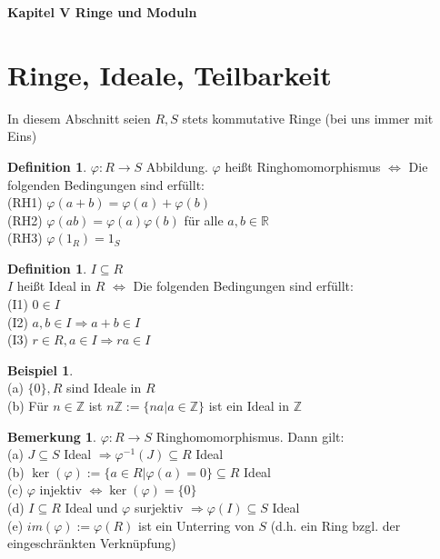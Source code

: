 \documentclass[10pt,a4paper,numbers=endperiod]{scrartcl}
\theoremstyle{definition}
\newtheorem{defi}[satz]{Definition}
\newtheorem{bem}[satz]{Bemerkung}
\newtheorem{bsp}[satz]{Beispiel}
\def\RR{{\mathbb R}}
\def\ZZ{{\mathbb Z}}
\begin{document}
\textbf{\Large Kapitel V Ringe und Moduln}\\

\section{Ringe, Ideale, Teilbarkeit}

In diesem Abschnitt seien $R,S$ stets kommutative Ringe (bei uns immer mit Eins)

\begin{defi}
	$\varphi: R \rightarrow S$ Abbildung. $\varphi$ heißt Ringhomomorphismus $\Leftrightarrow$ Die folgenden Bedingungen sind erfüllt:\\
	(RH1) $\varphi(a+b) = \varphi(a) + \varphi(b)$\\
	(RH2) $\varphi(ab) = \varphi(a)\varphi(b)$ für alle $a,b \in \RR$\\
	(RH3) $\varphi(1_R) = 1_S$
\end{defi}

\begin{defi}
	$I \subseteq R$\\
	$I$ heißt Ideal in $R$ $\Leftrightarrow$ Die folgenden Bedingungen sind erfüllt:\\
	(I1) $0 \in I$\\
	(I2) $a, b \in I \Rightarrow a+b \in I$\\
	(I3) $r \in R, a \in I \Rightarrow ra \in I$
\end{defi}

\begin{bsp}
	$ $\\
	(a) $\{0\}, R$ sind Ideale in $R$\\
	(b) Für $n \in \ZZ$ ist $n\ZZ := \{na| a \in \ZZ\}$ ist ein Ideal in $\ZZ$
\end{bsp}

\begin{bem}
	$\varphi: R \rightarrow S$ Ringhomomorphismus. Dann gilt:\\
	(a) $J \subseteq S$ Ideal $\Rightarrow \varphi^{-1} (J) \subseteq R$ Ideal\\
	(b) $\ker(\varphi) := \{a \in R| \varphi(a) = 0 \} \subseteq R$ Ideal\\
	(c) $\varphi$ injektiv $\Leftrightarrow \ker(\varphi) = \{0\}$\\
	(d) $I \subseteq R$ Ideal und $\varphi$ surjektiv $\Rightarrow \varphi(I) \subseteq S$ Ideal\\
	(e) $im(\varphi) := \varphi(R)$ ist ein Unterring von $S$ (d.h. ein Ring bzgl. der eingeschränkten Verknüpfung) 
\end{bem}
\end{document}
